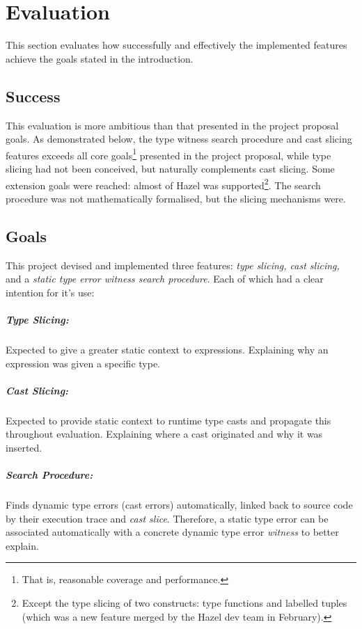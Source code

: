 \chapter{Evaluation}\label{chap:Evaluation}
This section evaluates how successfully and effectively the implemented features achieve the goals stated in the introduction.

\section{Success}
This evaluation is more ambitious than that presented in the project proposal goals. As demonstrated below, the type witness search procedure and cast slicing features exceeds all core goals\footnote{That is, reasonable coverage and performance.} presented in the project proposal, while type slicing had not been conceived, but naturally complements cast slicing. Some extension goals were reached: almost of Hazel was supported\footnote{Except the type slicing of two constructs: type functions and labelled tuples (which was a new feature merged by the Hazel dev team in February).}. The search procedure was not mathematically formalised, but the slicing mechanisms were.

\section{Goals}\label{sec:EvaluationGoals}
This project devised and implemented three features: \textit{type slicing, cast slicing,} and a \textit{static type error witness search procedure}. Each of which had a clear intention for it's use:

\paragraph{Type Slicing:} Expected to give a greater static context to expressions. Explaining why an expression was given a specific type.

\paragraph{Cast Slicing:} Expected to provide static context to runtime type casts and propagate this throughout evaluation. Explaining where a cast originated and why it was inserted.

\paragraph{Search Procedure:} Finds dynamic type errors (cast errors) automatically, linked back to source code by their execution trace and \textit{cast slice}. Therefore, a static type error can be associated automatically with a concrete dynamic type error \textit{witness} to better explain.

